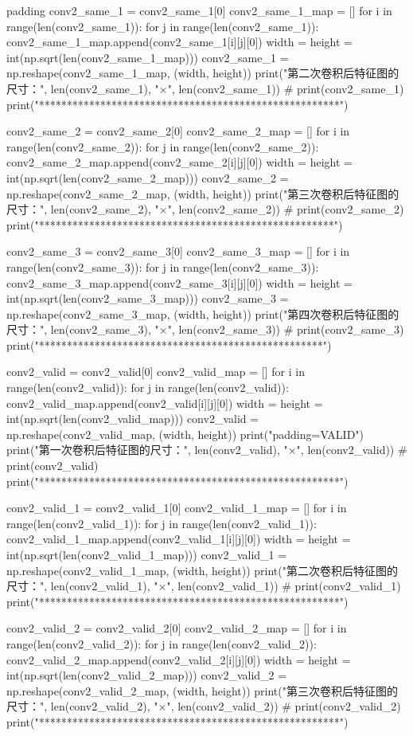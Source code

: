 \documentclass[openbib]{article}
\begin{document}
\begin{Python}{padding}
	conv2_same_1 = conv2_same_1[0]
	conv2_same_1_map = []
	for i in range(len(conv2_same_1)):
	for j in range(len(conv2_same_1)):
	conv2_same_1_map.append(conv2_same_1[i][j][0])
	width = height = int(np.sqrt(len(conv2_same_1_map)))
	conv2_same_1 = np.reshape(conv2_same_1_map, (width, height))
	print("第二次卷积后特征图的尺寸：", len(conv2_same_1), "×", len(conv2_same_1))
	#	print(conv2_same_1)
	print("******************************************************")
	
	conv2_same_2 = conv2_same_2[0]
	conv2_same_2_map = []
	for i in range(len(conv2_same_2)):
	for j in range(len(conv2_same_2)):
	conv2_same_2_map.append(conv2_same_2[i][j][0])
	width = height = int(np.sqrt(len(conv2_same_2_map)))
	conv2_same_2 = np.reshape(conv2_same_2_map, (width, height))
	print("第三次卷积后特征图的尺寸：", len(conv2_same_2), "×", len(conv2_same_2))
	#	print(conv2_same_2)
	print("*****************************************************")
	
	conv2_same_3 = conv2_same_3[0]
	conv2_same_3_map = []
	for i in range(len(conv2_same_3)):
	for j in range(len(conv2_same_3)):
	conv2_same_3_map.append(conv2_same_3[i][j][0])
	width = height = int(np.sqrt(len(conv2_same_3_map)))
	conv2_same_3 = np.reshape(conv2_same_3_map, (width, height))
	print("第四次卷积后特征图的尺寸：", len(conv2_same_3), "×", len(conv2_same_3))
	#	print(conv2_same_3)
	print("***************************************************\n")
	
	conv2_valid = conv2_valid[0]
	conv2_valid_map = []
	for i in range(len(conv2_valid)):
	for j in range(len(conv2_valid)):
	conv2_valid_map.append(conv2_valid[i][j][0])
	width = height = int(np.sqrt(len(conv2_valid_map)))
	conv2_valid = np.reshape(conv2_valid_map, (width, height))
	print("padding=VALID")
	print("第一次卷积后特征图的尺寸：", len(conv2_valid), "×", len(conv2_valid))
	#	print(conv2_valid)
	print("******************************************************")
	
	conv2_valid_1 = conv2_valid_1[0]
	conv2_valid_1_map = []
	for i in range(len(conv2_valid_1)):
	for j in range(len(conv2_valid_1)):
	conv2_valid_1_map.append(conv2_valid_1[i][j][0])
	width = height = int(np.sqrt(len(conv2_valid_1_map)))
	conv2_valid_1 = np.reshape(conv2_valid_1_map, (width, height))
	print("第二次卷积后特征图的尺寸：", len(conv2_valid_1), "×", len(conv2_valid_1))
	#	print(conv2_valid_1)
	print("******************************************************")
	
	conv2_valid_2 = conv2_valid_2[0]
	conv2_valid_2_map = []
	for i in range(len(conv2_valid_2)):
	for j in range(len(conv2_valid_2)):
	conv2_valid_2_map.append(conv2_valid_2[i][j][0])
	width = height = int(np.sqrt(len(conv2_valid_2_map)))
	conv2_valid_2 = np.reshape(conv2_valid_2_map, (width, height))
	print("第三次卷积后特征图的尺寸：", len(conv2_valid_2), "×", len(conv2_valid_2))
	#	print(conv2_valid_2)
	print("******************************************************")



\end{Python}
\end{document}
